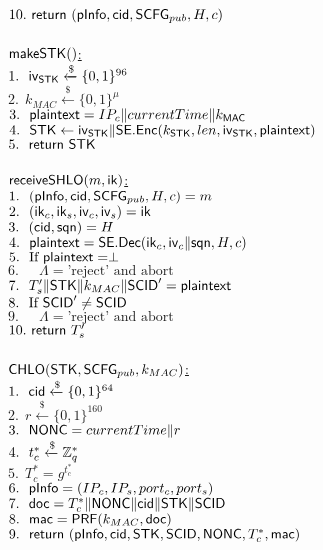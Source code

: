  $10.\  \mathsf{return}\ (\mathsf{pInfo}, \mathsf{cid}, \mathsf{SCFG}_{pub}, H, c)$ \\
\\
\underline{$\mathsf{makeSTK}()$:} \\
 $1.\ \ \mathsf{iv}_{\mathsf{STK}} \xleftarrow{\$} \{0,1\}^{96}$ \\
 $2.\ \ k_{MAC} \xleftarrow{\$} \{0,1\}^{\mu}$ \\
 $3.\ \ \mathsf{plaintext} = IP_c \| currentTime \| k_{\mathsf{MAC}}$ \\
 $4.\ \ \mathsf{STK} \leftarrow \mathsf{iv}_{\mathsf{STK}} \| \mathsf{SE}.\mathsf{Enc}(k_{\mathsf{STK}}, len, \mathsf{iv}_{\mathsf{STK}}, \mathsf{plaintext})$ \\
 $5.\ \ \mathsf{return}\ \mathsf{STK}$ \\
\\
\underline{$\mathsf{receiveSHLO}(m, \mathsf{ik})$:} \\
 $1.\ \ (\mathsf{pInfo}, \mathsf{cid}, \mathsf{SCFG}_{pub}, H, c) = m$ \\
 $2.\ \ (\mathsf{ik}_c, \mathsf{ik}_s, \mathsf{iv}_c, \mathsf{iv}_s) = \mathsf{ik}$ \\
 $3.\ \ (\mathsf{cid}, \mathsf{sqn}) = H$ \\
 $4.\ \ \mathsf{plaintext} = \mathsf{SE}.\mathsf{Dec}(\mathsf{ik}_c, \mathsf{iv}_c \| \mathsf{sqn}, H, c)$ \\
 $5.\ \ \text{If }\mathsf{plaintext} = \perp$ \\
 $6.\ \ \quad \Lambda = \text{'reject' and abort}$ \\
 $7.\ \ T_{s}^{\prime} \| \mathsf{STK} \| k_{MAC} \| \mathsf{SCID}^{\prime} = \mathsf{plaintext} $ \\
 $8.\ \ \text{If }\mathsf{SCID}^{\prime} \neq \mathsf{SCID}$ \\
 $9.\ \ \quad \Lambda = \text{'reject' and abort}$ \\
 $10.\  \mathsf{return}\ T_s^{\prime}$ \\
\\
\underline{$\mathsf{CHLO}(\mathsf{STK}, \mathsf{SCFG}_{pub}, k_{MAC})$:} \\
 $1.\ \ \mathsf{cid} \xleftarrow{\$} \{0,1\}^{64}$ \\
 $2.\ \ r \xleftarrow{\$} \{0,1\}^{160}$ \\
 $3.\ \ \mathsf{NONC} = currentTime \| r$ \\
 $4.\ \ t_c^{\ast} \xleftarrow{\$} \mathbb{Z}_{q}^{\ast}$ \\
 $5.\ \ T_c^{\ast} = g^{t_c^{\ast}}$ \\
 $6.\ \ \mathsf{pInfo} = (IP_c, IP_s, port_c, port_s)$ \\
 $7.\ \ \mathsf{doc} = T_c^{\ast} \| \mathsf{NONC} \| \mathsf{cid} \| \mathsf{STK} \| \mathsf{SCID}$ \\
 $8.\ \ \mathsf{mac} = \mathsf{PRF}(k_{MAC}, \mathsf{doc}) $ \\
 $9.\ \ \mathsf{return}\ (\mathsf{pInfo}, \mathsf{cid}, \mathsf{STK}, \mathsf{SCID}, \mathsf{NONC}, T_c^{\ast}, \mathsf{mac})$ \\
